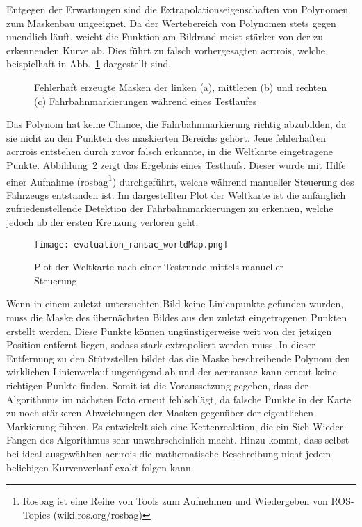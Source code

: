 Entgegen der Erwartungen sind die Extrapolationseigenschaften von Polynomen zum Maskenbau ungeeignet. Da der Wertebereich von Polynomen stets gegen unendlich läuft, weicht die Funktion am Bildrand meist stärker von der zu erkennenden Kurve ab. Dies führt zu falsch vorhergesagten \glspl{acr:roi}, welche beispielhaft in Abb.~\ref{fig:evaluation_ransac_ransac} dargestellt sind.

\begin{figure}[H]
	\centering
	\quad
	\quad
	\caption{Fehlerhaft erzeugte Masken der linken (a), mittleren (b) und rechten (c) Fahrbahnmarkierungen während eines Testlaufes}
	\label{fig:evaluation_ransac_ransac}
\end{figure} 

Das Polynom hat keine Chance, die Fahrbahnmarkierung richtig abzubilden, da sie nicht zu den Punkten des maskierten Bereichs gehört. Jene fehlerhaften \glspl{acr:roi} entstehen durch zuvor falsch erkannte, in die Weltkarte eingetragene Punkte. Abbildung~\ref{evaluation_ransac_weltkarte} zeigt das Ergebnis eines Testlaufs. Dieser wurde mit Hilfe einer Aufnahme (rosbag\footnote{Rosbag ist eine Reihe von Tools zum Aufnehmen und Wiedergeben von ROS-Topics (wiki.ros.org/rosbag)}) durchgeführt, welche während manueller Steuerung des Fahrzeugs entstanden ist. Im dargestellten Plot der Weltkarte ist die anfänglich zufriedenstellende Detektion der Fahrbahnmarkierungen zu erkennen, welche jedoch ab der ersten Kreuzung verloren geht.

\begin{figure}[htbp] %
	\centering
	\texttt{[image: evaluation\_ransac\_worldMap.png]}
	\caption{Plot der Weltkarte nach einer Testrunde mittels manueller Steuerung}
	\label{evaluation_ransac_weltkarte}
\end{figure} 

Wenn in einem zuletzt untersuchten Bild keine Linienpunkte gefunden wurden, muss die Maske des übernächsten Bildes aus den zuletzt eingetragenen Punkten erstellt werden. Diese Punkte können ungünstigerweise weit von der jetzigen Position entfernt liegen, sodass stark extrapoliert werden muss. In dieser Entfernung zu den Stützstellen bildet das die Maske beschreibende Polynom den wirklichen Linienverlauf ungenügend ab und der \gls{acr:ransac} kann erneut keine richtigen Punkte finden. Somit ist die Voraussetzung gegeben, dass der Algorithmus im nächsten Foto erneut fehlschlägt, da falsche Punkte in der Karte zu noch stärkeren Abweichungen der Masken gegenüber der eigentlichen Markierung führen. Es entwickelt sich eine Kettenreaktion, die ein \glqq Sich-Wieder-Fangen\grqq{} des Algorithmus sehr unwahrscheinlich macht. 
Hinzu kommt, dass selbst bei ideal ausgewählten \glspl{acr:roi} die mathematische Beschreibung nicht jedem beliebigen Kurvenverlauf exakt folgen kann. 



